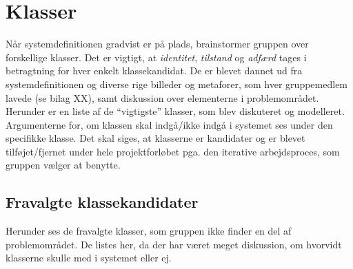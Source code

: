 \section{Klasser}
\label{sec:klasser}
Når systemdefinitionen gradvist er på plads, brainstormer gruppen over forskellige klasser. Det er vigtigt, at \emph{identitet}, \emph{tilstand} og \emph{adfærd} tages i betragtning for hver enkelt klassekandidat. De er blevet dannet ud fra systemdefinitionen og diverse rige billeder og metaforer, som hver gruppemedlem lavede (se bilag XX), samt diskussion over elementerne i problemområdet. Herunder er en liste af de ``vigtigste'' klasser, som blev diskuteret og modelleret. Argumenterne for, om klassen skal indgå/ikke indgå i systemet ses under den specifikke klasse. Det skal siges, at klasserne er kandidater og er blevet tilføjet/fjernet under hele projektforløbet pga. den iterative arbejdsproces, som gruppen vælger at benytte.

\subsection{Fravalgte klassekandidater}
Herunder ses de fravalgte klasser, som gruppen ikke finder en del af problemområdet. De listes her, da der har været meget diskussion, om hvorvidt klasserne skulle med i systemet eller ej. 

